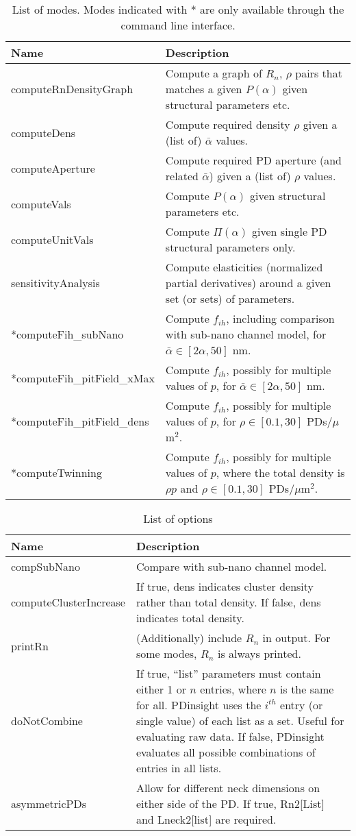 \documentclass[a4paper,12pt]{article}
\newcommand{\SEL}{\bar{\alpha}}
\newcommand{\patchy}{f_{ih}}
\begin{document}
\begin{table}
\caption{List of modes. Modes indicated with * are only available through the command line interface.}
\label{tab:modes}
\begin{tabular}{l  p{}}
Name & Description\\
\hline
computeRnDensityGraph & Compute a graph of $R_n$, $\rho$ pairs that matches a given $P(\alpha)$ given structural parameters etc.\\
computeDens & Compute required density $\rho$ given a (list of) $\SEL$ values.\\
computeAperture & Compute required PD aperture (and related $\SEL$) given a (list of) $\rho$ values.\\
computeVals & Compute  $P(\alpha)$ given structural parameters etc.\\
computeUnitVals & Compute $\Pi(\alpha)$ given single PD structural parameters only.\\
sensitivityAnalysis & Compute elasticities (normalized partial derivatives) around a given set (or sets) of parameters.\\
*computeFih\_subNano & Compute $\patchy$, including comparison with sub-nano channel model, for $\SEL\in[2\alpha,50]$ nm.\\
*computeFih\_pitField\_xMax & Compute $\patchy$, possibly for multiple values of $p$, for $\SEL\in[2\alpha,50]$ nm.\\
*computeFih\_pitField\_dens& Compute $\patchy$, possibly for multiple values of $p$, for $\rho\in[0.1,30]$ PDs/$\mu$m$^2$.\\
*computeTwinning&Compute $\patchy$, possibly for multiple values of $p$, where the total density is $\rho p$ and $\rho\in[0.1,30]$ PDs/$\mu$m$^2$.\\
\end{tabular}
\end{table}

\begin{table}
\caption{List of options}
\label{tab:options}
\begin{tabular}{l  p{}}
Name & Description\\
\hline
compSubNano & Compare with sub-nano channel model.\\
computeClusterIncrease & If true, dens indicates cluster density  rather than total density. If false, dens indicates total density.\\
printRn & (Additionally) include $R_n$ in output. For some modes, $R_n$ is always printed.\\
doNotCombine & If true, ``list'' parameters must contain either 1 or $n$ entries, where $n$ is the same for all. PDinsight uses the $i^{th}$ entry (or single value) of each list as a set. Useful for evaluating raw data. If false, PDinsight evaluates all possible combinations of entries in all lists. \\
asymmetricPDs & Allow for different neck dimensions on either side of the PD. If true, Rn2[List] and Lneck2[list] are required. \\
\end{tabular}
\end{table}





\end{document}
